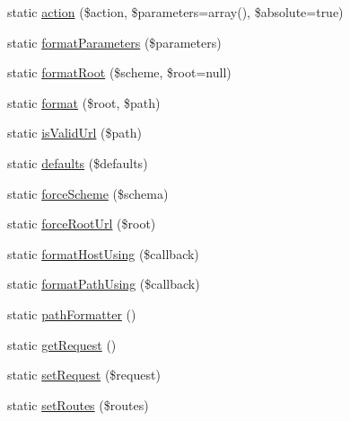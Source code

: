 \begin{DoxyCompactItemize}
static \mbox{\hyperlink{class_illuminate_1_1_support_1_1_facades_1_1_u_r_l_aa9bc48532642767caa0e353dc7b9c11b}{action}} (\$action, \$parameters=array(), \$absolute=true)
\item 
static \mbox{\hyperlink{class_illuminate_1_1_support_1_1_facades_1_1_u_r_l_aa4438a1945aec7e5a0b2aad38d2e27fd}{format\+Parameters}} (\$parameters)
\item 
static \mbox{\hyperlink{class_illuminate_1_1_support_1_1_facades_1_1_u_r_l_a7ca91f38aa69ace2fe1f0660f090fb5a}{format\+Root}} (\$scheme, \$root=null)
\item 
static \mbox{\hyperlink{class_illuminate_1_1_support_1_1_facades_1_1_u_r_l_a6a75a7c03134b39ada6561c664766570}{format}} (\$root, \$path)
\item 
static \mbox{\hyperlink{class_illuminate_1_1_support_1_1_facades_1_1_u_r_l_ac55e67d752a9ae77a71d8f907742083d}{is\+Valid\+Url}} (\$path)
\item 
static \mbox{\hyperlink{class_illuminate_1_1_support_1_1_facades_1_1_u_r_l_a844811bd73afb16607a1cdbafc8d1655}{defaults}} (\$defaults)
\item 
static \mbox{\hyperlink{class_illuminate_1_1_support_1_1_facades_1_1_u_r_l_a6916466007e7e72617612a1c5c012b16}{force\+Scheme}} (\$schema)
\item 
static \mbox{\hyperlink{class_illuminate_1_1_support_1_1_facades_1_1_u_r_l_affa0a278515bdee828f5423493113e96}{force\+Root\+Url}} (\$root)
\item 
static \mbox{\hyperlink{class_illuminate_1_1_support_1_1_facades_1_1_u_r_l_aac985058f2d0aac87b2bc3a160fcfc0b}{format\+Host\+Using}} (\$callback)
\item 
static \mbox{\hyperlink{class_illuminate_1_1_support_1_1_facades_1_1_u_r_l_a6fb4b521f5d25cfa8f2ce8ffc16277f4}{format\+Path\+Using}} (\$callback)
\item 
static \mbox{\hyperlink{class_illuminate_1_1_support_1_1_facades_1_1_u_r_l_aca75e1a1df2dd217d35c519a06eec023}{path\+Formatter}} ()
\item 
static \mbox{\hyperlink{class_illuminate_1_1_support_1_1_facades_1_1_u_r_l_ae266058d3eb66f74598703be2bf7a0c5}{get\+Request}} ()
\item 
static \mbox{\hyperlink{class_illuminate_1_1_support_1_1_facades_1_1_u_r_l_a8fba49ba04bc1647107d0702ca6a640f}{set\+Request}} (\$request)
\item 
static \mbox{\hyperlink{class_illuminate_1_1_support_1_1_facades_1_1_u_r_l_a6f7d9edb24f65c7a7b3d67c14b7b023b}{set\+Routes}} (\$routes)
\item 

\end{DoxyCompactItemize}
